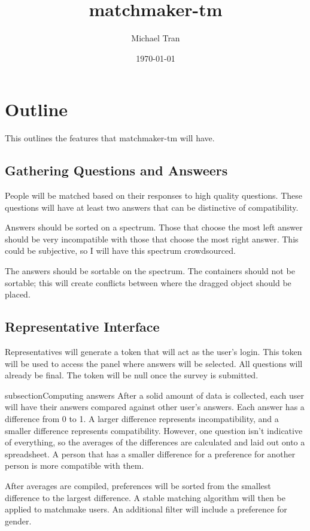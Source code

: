 \documentclass[12pt]{article}
\title{matchmaker-tm}
\author{Michael Tran}
\date{\today}
\begin{document}
\maketitle

\section{Outline}
This outlines the features that matchmaker-tm will have.

\subsection{Gathering Questions and Answeers}
People will be matched based on their responses to high quality questions. These
questions will have at least two answers that can be distinctive of
compatibility.

Answers should be sorted on a spectrum. Those that choose the most left answer
should be very incompatible with those that choose the most right answer. This
could be subjective, so I will have this spectrum crowdsourced.

The answers should be sortable on the spectrum. The containers should not be
sortable; this will create conflicts between where the dragged object should be
placed.

\subsection{Representative Interface}
Representatives will generate a token that will act as the user's login. This
token will be used to access the panel where answers will be selected. All
questions will already be final. The token will be null once the survey is
submitted.

subsection{Computing answers}
After a solid amount of data is collected, each user will have their answers
compared against other user's answers. Each answer has a difference from 0 to 1.
A larger difference represents incompatibility, and a smaller difference
represents compatibility. However, one question isn't indicative of everything,
so the averages of the differences are calculated and laid out onto a
spreadsheet. A person that has a smaller difference for a preference for another 
person is more compatible with them.

After averages are compiled, preferences will be sorted from the smallest
difference to the largest difference. A stable matching algorithm will then be
applied to matchmake users. An additional filter will include a preference for
gender.
\end{document}
